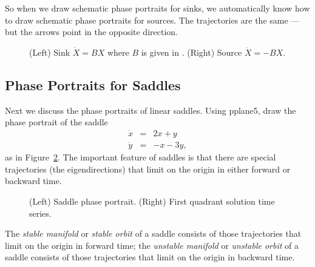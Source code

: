 \documentclass{ximera}
\begin{document}
So when we draw schematic phase portraits
for sinks, we automatically know
how to draw schematic phase portraits for
sources.  The trajectories are
the same --- but the arrows point in the opposite direction.

\begin{figure}[htb]
           \centerline{%
           }
           \caption{(Left) Sink $\dot{X}=BX$ where $B$ is given in
.  (Right) Source $\dot{X}=-BX$.}
           \label{F:SS}
\end{figure}


\subsection*{Phase Portraits for Saddles}

Next we discuss the phase portraits of linear saddles.  Using
{\sf pplane5}, draw the phase portrait
of the saddle
\begin{equation}  \label{e:saddlet}
\begin{array}{rcl}
\dot{x} & = & 2x+y\\
\dot{y} & = & -x-3y,
\end{array}
\end{equation}
as in Figure~\ref{F:linsaddle}.  The important feature of saddles
is that there are special trajectories (the eigendirections) that
limit on the origin in either forward or backward time.

\begin{figure}[htb]
           \centerline{%
           }
           \caption{(Left) Saddle phase portrait.
	(Right) First quadrant solution time series.}
           \label{F:linsaddle}
\end{figure}

\begin{Def} \label{D:stablemfld}
The {\em stable manifold\/} or {\em stable orbit\/} of a saddle consists of
those trajectories that limit on the origin in forward time; the
{\em unstable manifold\/} or {\em unstable orbit\/} of a saddle consists of
those trajectories that limit on the origin in backward time.
\end{Def}
 
 
\end{document}
